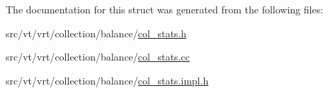 The documentation for this struct was generated from the following files\+:\begin{DoxyCompactItemize}
\item 
src/vt/vrt/collection/balance/\hyperlink{col__stats_8h}{col\+\_\+stats.\+h}\item 
src/vt/vrt/collection/balance/\hyperlink{col__stats_8cc}{col\+\_\+stats.\+cc}\item 
src/vt/vrt/collection/balance/\hyperlink{col__stats_8impl_8h}{col\+\_\+stats.\+impl.\+h}\end{DoxyCompactItemize}
